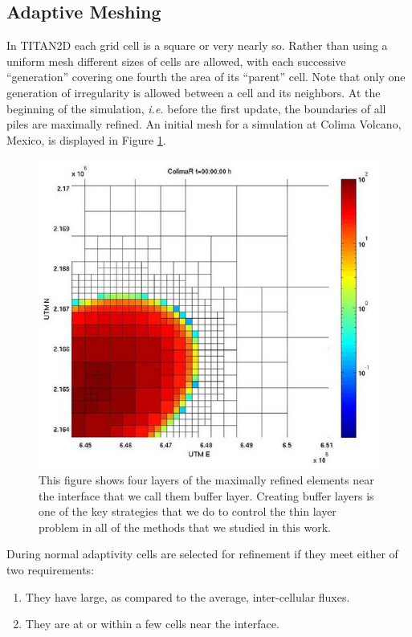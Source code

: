 \documentclass[review]{elsarticle}
\begin{document}
\subsection{Adaptive Meshing} \label{adaptivemeshing}
In TITAN2D each grid cell is a square or very nearly so. Rather than 
using a uniform mesh different sizes of cells are allowed, with each 
successive ``generation'' covering one fourth the area of its ``parent'' 
cell.  Note that only one generation of irregularity is allowed between 
a cell and its neighbors.
At the beginning of the simulation, \textit{i.e.} before the first update, the 
boundaries of all piles are maximally refined. An initial mesh for a 
simulation at Colima Volcano, Mexico, is displayed in Figure \ref{bufcell}. 
\begin{figure}[!h]
        \begin{center}
                \includegraphics[scale=.3]{IMAGES/buffercells.png}
                \caption{This figure shows four layers of the maximally refined elements near the interface that we call them buffer layer. Creating buffer layers is one of the key strategies that we do to control the thin layer problem in all of the methods that we studied in this work.}
                \label{bufcell}
        \end{center}
\end{figure} 
During normal adaptivity cells are selected for refinement if they meet 
either of two requirements:
\begin{enumerate} 
        \item They have large, as compared to the average, inter-cellular fluxes.
        \item They are at or within a few cells near the interface.
\end{enumerate}
\end{document}
